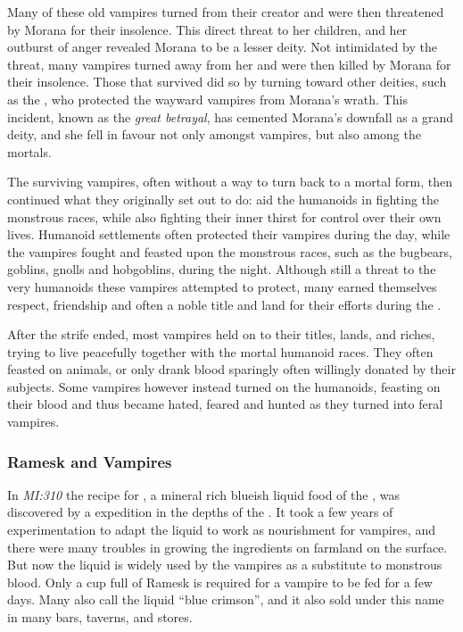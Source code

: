 Many of these old vampires turned from their creator and were then threatened
by Morana for their insolence. This direct threat to her children, and her
outburst of anger revealed Morana to be a lesser deity. Not intimidated by the
threat, many vampires turned away from her and were then killed by Morana for
their insolence. Those that survived did so by turning toward other deities,
such as the , who protected the wayward vampires
from Morana's wrath. This incident, known as the \emph{great betrayal}, has
cemented Morana's downfall as a grand deity, and she fell in favour not only
amongst vampires, but also among the mortals.

The surviving vampires, often without a way to turn back to a mortal form,
then continued what they originally set out to do: aid the humanoids in
fighting the monstrous races, while also fighting their inner thirst for
control over their own lives. Humanoid settlements often protected their
vampires during the day, while the vampires fought and feasted upon the
monstrous races, such as the bugbears, goblins, gnolls and hobgoblins, during
the night. Although still a threat to the very humanoids these vampires
attempted to protect, many earned themselves respect, friendship and often a
noble title and land for their efforts during the .

After the strife ended, most vampires held on to their titles, lands, and
riches, trying to live peacefully together with the mortal humanoid races.
They often feasted on animals, or only drank blood sparingly often willingly
donated by their subjects. Some vampires however instead turned on the
humanoids, feasting on their blood and thus became hated, feared and hunted as
they turned into feral vampires.

\subsubsection{Ramesk and Vampires}

In \emph{MI:310} the recipe for , a mineral rich blueish
liquid food of the , was discovered by a
 expedition in the depths of the . It took a few years of experimentation to adapt the liquid to work
as nourishment for vampires, and there were many troubles in growing the
ingredients on farmland on the surface. But now the liquid is widely used by
the vampires as a substitute to monstrous blood. Only a cup full of Ramesk is
required for a vampire to be fed for a few days. Many also call the liquid
``blue crimson'', and it also sold under this name in many bars, taverns,
and stores.

